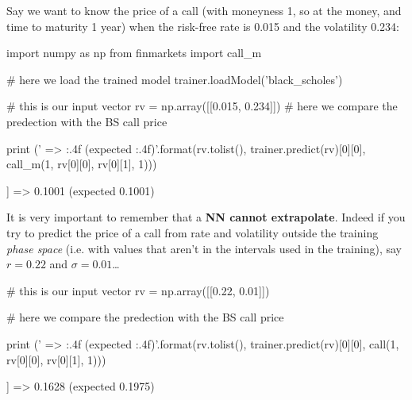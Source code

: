 %

Say we want to know the price of a call (with moneyness 1, so at the money, and time to maturity 1 year) when the risk-free rate is 0.015 and the volatility 0.234:

\begin{ipython}
import numpy as np
from finmarkets import call_m

# here we load the trained model
trainer.loadModel('black_scholes')

# this is our input vector
rv = np.array([[0.015, 0.234]])
# here we compare the predection with the BS call price

print ('{} => {:.4f} (expected {:.4f})'.format(rv.tolist(),
                                               trainer.predict(rv)[0][0],
                                               call_m(1, rv[0][0], rv[0][1], 1)))
\end{ipython}
\begin{ioutput}
[[0.015, 0.234]] => 0.1001 (expected 0.1001)
\end{ioutput}

It is very important to remember that a \textbf{NN cannot extrapolate}.
Indeed if you try to predict the price of a call from rate and volatility outside the training \emph{phase space} (i.e. with values that aren't in the intervals used in the training), say \(r = 0.22\) and \(\sigma = 0.01\)\ldots{}

\begin{ipython}
# this is our input vector
rv = np.array([[0.22, 0.01]])

# here we compare the predection with the BS call price

print ('{} => {:.4f} (expected {:.4f})'.format(rv.tolist(),
                                        trainer.predict(rv)[0][0],
                                        call(1, rv[0][0], rv[0][1], 1)))
\end{ipython}
\begin{ioutput}
[[0.22, 0.01]] => 0.1628 (expected 0.1975)
\end{ioutput}

